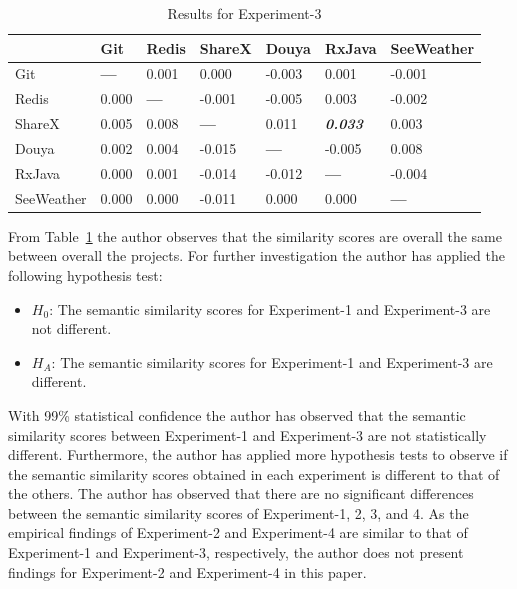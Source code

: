 \documentclass[conference]{IEEEtran}
\begin{document}
\begin{table}[]
\centering
\caption{Results for Experiment-3}
\label{table-res-exp3}
\begin{tabular}{lllllll}
\hline
           & Git & Redis & ShareX & Douya & RxJava & SeeWeather \\
\hline
Git        & \bf{---} & 0.001 & 0.000 & -0.003 & 0.001 & -0.001 \\
Redis      & 0.000 & \bf{---} & -0.001 & -0.005 & 0.003 & -0.002 \\
ShareX     & 0.005 & 0.008 & \bf{---} & 0.011 & \bf{\textit{0.033}} & 0.003 \\
Douya      & 0.002 & 0.004 & -0.015 & \bf{---} & -0.005 & 0.008 \\
RxJava     & 0.000 & 0.001 & -0.014 & -0.012 & \bf{---} & -0.004 \\     
SeeWeather & 0.000 & 0.000 & -0.011 & 0.000 & 0.000 & \bf{---} \\     
\hline
\end{tabular}
\end{table}
From Table~\ref{table-res-exp3} the author observes that the similarity scores are overall the same between overall the projects. For further investigation the author has applied the following hypothesis test: 
\begin{itemize}
\item{$H_{0}$: The semantic similarity scores for Experiment-1 and Experiment-3 are not different. }
\item{$H_{A}$: The semantic similarity scores for Experiment-1 and Experiment-3 are different. }
\end{itemize} 
With 99\% statistical confidence the author has observed that the semantic similarity scores between Experiment-1 and Experiment-3 are not statistically different. Furthermore, the author has applied more hypothesis tests to observe if the semantic similarity scores obtained in each experiment is different to that of the others. The author has observed that there are no significant differences between the semantic similarity scores of Experiment-1, 2, 3, and 4. As the empirical findings of Experiment-2 and Experiment-4 are similar to that of Experiment-1 and Experiment-3, respectively, the author does not present findings for Experiment-2 and Experiment-4 in this paper. 
  
\end{document}

